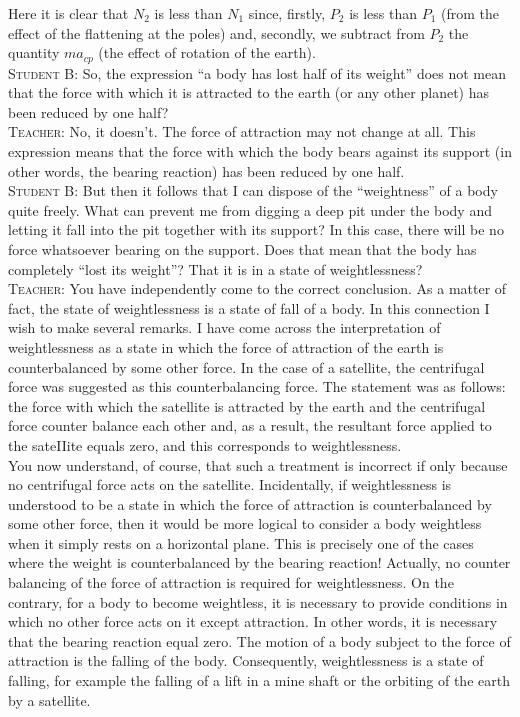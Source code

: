 \documentclass[a4paper,sfsidenotes]{tufte-book}
\begin{document}
Here it is clear that $N_{2}$ is less than $N_{1}$ since, firstly, $P_{2}$ is less than $P_{1}$ (from the effect of the flattening at the poles) and, secondly, we subtract from $P_{2}$ the quantity $ma_{cp}$ (the effect of rotation of the earth).
\\
\textsc{Student B:} So, the expression ``a body has lost half of its weight'' does not mean that the force with which it is attracted to the earth (or any other planet) has been reduced by one half?
\\
\textsc{Teacher:} No, it doesn't. The force of attraction may not change at all. This expression means that the force with which the body bears against its support (in other words, the bearing reaction) has been reduced by one half.
\\
\textsc{Student B:} But then it follows that I can dispose of the ``weightness'' of a body quite freely. What can prevent me from digging a deep pit under the body and letting it fall into the
pit together with its support? In this case, there will be no force whatsoever bearing on the support. Does that mean that the body has completely ``lost its weight''? That it is in a state of weightlessness?
\\
\textsc{Teacher:} You have independently come to the correct conclusion. As a matter of fact, the state of weightlessness is a state of fall of a body. In this connection I wish to make several remarks. I have come across the interpretation of weightlessness as a state in which the force of attraction of
the earth is counterbalanced by some other force. In the case of a satellite, the centrifugal force was suggested as this counterbalancing force. The statement was as follows: 
\\
the force with which the satellite is attracted by the earth and the centrifugal force counter balance each other and, as a result, the resultant force applied to the sateIIite equals zero, and this corresponds to weightlessness.
\\
You now understand, of course, that such a treatment is incorrect if only because no centrifugal force acts on the satellite. Incidentally, if weightlessness is understood to be a state in which the force of attraction is counterbalanced by some other force, then it would be more logical to consider a body weightless when it simply rests on a horizontal plane. This is precisely one of the cases where the weight is counterbalanced by the bearing reaction! Actually, no counter balancing of the force of attraction is required for weightlessness. On the contrary, for a body to become weightless, it is necessary to provide conditions in which no other force acts on it except attraction. In other words, it is necessary that the bearing reaction equal zero. The motion of a body subject to the force of attraction is the falling of the body. Consequently, weightlessness is a state of falling, for example the falling of a lift in a mine shaft or the orbiting of the earth by a satellite.
\end{document}
